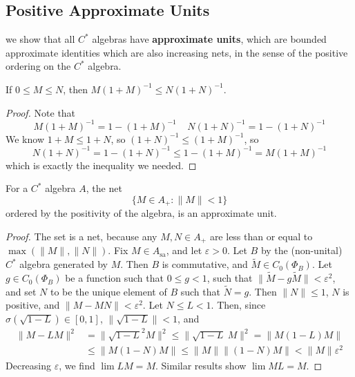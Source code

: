 \subsection{Positive Approximate Units}

we show that all $C^*$ algebras have {\bf approximate units}, which are bounded approximate identities which are also increasing nets, in the sense of the positive ordering on the $C^*$ algebra.

\begin{lemma}
    If $0 \leq M \leq N$, then $M(1 + M)^{-1} \leq N(1 + N)^{-1}$.
\end{lemma}
\begin{proof}
    Note that
    \[ M(1 + M)^{-1} = 1 - (1 + M)^{-1}\ \ \ \ \ N(1 + N)^{-1} = 1 - (1 + N)^{-1} \]
    We know $1 + M \leq 1 + N$, so $(1 + N)^{-1} \leq (1 + M)^{-1}$, so
    \[ N(1 + N)^{-1} = 1-(1 + N)^{-1} \leq 1-(1 + M)^{-1} = M(1 + M)^{-1} \]
    which is exactly the inequality we needed.
\end{proof}

\begin{prop}
    For a $C^*$ algebra $A$, the net
    \[ \{ M \in A_+ : \| M \| < 1 \} \]
    ordered by the positivity of the algebra, is an approximate unit.
\end{prop}
\begin{proof}
    The set is a net, because any $M,N \in A_+$ are less than or equal to $\max(\|M\|,\|N\|)$. Fix $M \in A_{\text{sa}}$, and let $\varepsilon > 0$. Let $B$ by the (non-unital) $C^*$ algebra generated by $M$. Then $B$ is commutative, and $\widetilde{M} \in C_0(\Phi_B)$. Let $g \in C_0(\Phi_B)$ be a function such that $0 \leq g < 1$, such that $\| \widetilde{M} - g \widetilde{M} \| < \varepsilon^2$, and set $N$ to be the unique element of $B$ such that $\widetilde{N} = g$. Then $\| N \| \leq 1$, $N$ is positive, and $\| M - MN \| < \varepsilon^2$. Let $N \leq L < 1$. Then, since $\sigma(\sqrt{1 - L}) \in [0,1]$, $\| \sqrt{1 - L} \| < 1$, and
    \begin{align*}
        \| M - LM \|^2 &= \| \sqrt{1 - L}^2 M \|^2 \leq \| \sqrt{1 - L}\ M \|^2 = \| M(1 - L)M \|\\
        &\leq \| M(1 - N)M \| \leq \| M \| \| (1 - N)M \| < \| M \| \varepsilon^2
    \end{align*}
    Decreasing $\varepsilon$, we find $\lim LM = M$. Similar results show $\lim ML = M$.
\end{proof}

